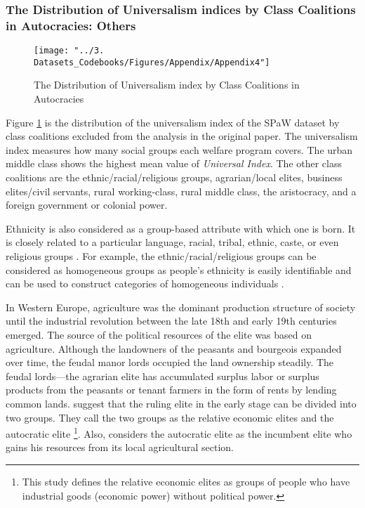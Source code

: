 \documentclass[12pt]{article}
\begin{document}
	\subsubsection{The Distribution of Universalism indices by Class Coalitions in Autocracies: Others}
	
	\begin{figure}[!ht]
		\centering
		\texttt{[image: "../3. Datasets\_Codebooks/Figures/Appendix/Appendix4"]}
		\caption{The Distribution of Universalism index by Class Coalitions in Autocracies}
		\label{fig:figure8}
	\end{figure}
	
	Figure \ref{fig:figure8} is the distribution of the universalism index of the SPaW dataset by class coalitions excluded from the analysis in the original paper. The universalism index measures how many social groups each welfare program covers. The urban middle class shows the highest mean value of \textit{Universal Index}. The other class coalitions are the ethnic/racial/religious groups, agrarian/local elites, business elites/civil servants, rural working-class, rural middle class, the aristocracy, and a foreign government or colonial power.
	
	Ethnicity is also considered as a group-based attribute with which one is born. It is closely related to a particular language, racial, tribal, ethnic, caste, or even religious groups \citep[41]{Huber2017}. For example, the ethnic/racial/religious groups can be considered as homogeneous groups as people's ethnicity is easily identifiable and can be used to construct categories of homogeneous individuals \citep{Alesina2005}. 
	
	In Western Europe, agriculture was the dominant production structure of society until the industrial revolution between the late 18th and early 19th centuries emerged. The source of the political resources of the elite was based on agriculture. Although the landowners of the peasants and bourgeois expanded over time, the feudal manor lords occupied the land ownership steadily. The feudal lords---the agrarian elite has accumulated surplus labor or surplus products from the peasants or tenant farmers in the form of rents by lending common lands. \citet{Ansell2015a} suggest that the ruling elite in the early stage can be divided into two groups. They call the two groups as the relative economic elites and the autocratic elite \footnote{This study defines the relative economic elites as groups of people who have industrial goods (economic power) without political power.}. Also, \citet{Ansell2015a} considers the autocratic elite as the incumbent elite who gains his resources from its local agricultural section.
	
\end{document}
